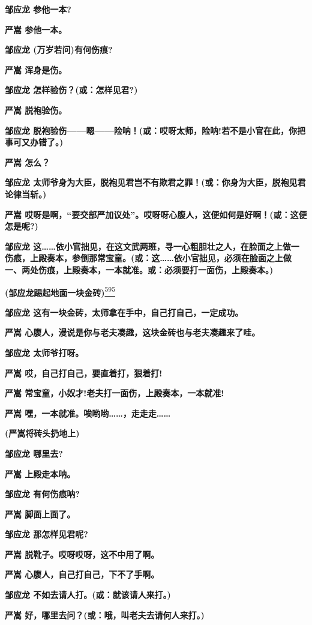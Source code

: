 \textbf{邹应龙 参他一本?}

\textbf{严嵩 参他一本。}

\textbf{邹应龙 (万岁若问)有何伤痕?}

\textbf{严嵩 浑身是伤。}

\textbf{邹应龙 怎样验伤？(或：怎样见君?)}

\textbf{严嵩 脱袍验伤。}

\textbf{邹应龙
脱袍验伤------嗯------险呐！(或：哎呀太师，险呐!若不是小官在此，你把事可又办错了。)}

\textbf{严嵩 怎么？}

\textbf{邹应龙
太师爷身为大臣，脱袍见君岂不有欺君之罪！(或：你身为大臣，脱袍见君论律当斩。)}

\textbf{严嵩
哎呀是啊，``要交部严加议处''。哎呀呀心腹人，这便如何是好啊！(或：这便怎是呢?)}

\textbf{邹应龙
这\ldots{}\ldots{}依小官拙见，在这文武两班，寻一心粗胆壮之人，在脸面之上做一伤痕，上殿奏本，参倒那常宝童。(或：这\ldots{}\ldots{}依小官拙见，必须在脸面之上做一、两处伤痕，上殿奏本，一本就准。或：必须要打一面伤，上殿奏本。)}

\textbf{(邹应龙踢起地面一块金砖)}\protect\hyperlink{fn595}{\textsuperscript{595}}

\textbf{邹应龙 这有一块金砖，太师拿在手中，自己打自己，一定成功。}

\textbf{严嵩 心腹人，漫说是你与老夫凑趣，这块金砖也与老夫凑趣来了哇。}

\textbf{邹应龙 太师爷打呀。}

\textbf{严嵩 哎，自己打自己，要直着打，狠着打!}

\textbf{严嵩 常宝童，小奴才!老夫打一面伤，上殿奏本，一本就准!}

\textbf{严嵩
嘿，一本就准。唉哟哟\ldots{}\ldots{}，走走走\ldots{}\ldots{}}

\textbf{(严嵩将砖头扔地上)}

\textbf{邹应龙 哪里去?}

\textbf{严嵩 上殿走本呐。}

\textbf{邹应龙 有何伤痕呐?}

\textbf{严嵩 脚面上面了。}

\textbf{邹应龙 那怎样见君呢?}

\textbf{严嵩 脱靴子。哎呀哎呀，这不中用了啊。}

\textbf{严嵩 心腹人，自己打自己，下不了手啊。}

\textbf{邹应龙 不如去请人打。(或：就该请人来打。)}

\textbf{严嵩 好，哪里去问？(或：哦，叫老夫去请何人来打。)}

